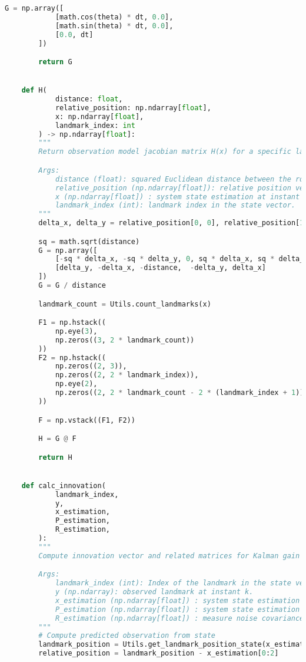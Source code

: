 \documentclass[../CSC_5RO12_TA_TP4.tex]{subfiles}
\begin{document}
\begin{scriptsize}
\begin{lstlisting}[language=Python]
        G = np.array([
            [math.cos(theta) * dt, 0.0],
            [math.sin(theta) * dt, 0.0],
            [0.0, dt]
        ])

        return G


    def H(
            distance: float,
            relative_position: np.ndarray[float],
            x: np.ndarray[float],
            landmark_index: int
        ) -> np.ndarray[float]:
        """
        Return observation model jacobian matrix H(x) for a specific landmark as np.ndarray[float].

        Args:
            distance (float): squared Euclidean distance between the robot and the landmark.
            relative_position (np.ndarray[float]): relative position vector [delta_x, delta_y]^T.
            x (np.ndarray[float]) : system state estimation at instant k.
            landmark_index (int): landmark index in the state vector.
        """
        delta_x, delta_y = relative_position[0, 0], relative_position[1, 0]

        sq = math.sqrt(distance)
        G = np.array([
            [-sq * delta_x, -sq * delta_y, 0, sq * delta_x, sq * delta_y],
            [delta_y, -delta_x, -distance,  -delta_y, delta_x]
        ])
        G = G / distance

        landmark_count = Utils.count_landmarks(x)

        F1 = np.hstack((
            np.eye(3),
            np.zeros((3, 2 * landmark_count))
        ))
        F2 = np.hstack((
            np.zeros((2, 3)),
            np.zeros((2, 2 * landmark_index)),
            np.eye(2),
            np.zeros((2, 2 * landmark_count - 2 * (landmark_index + 1)))
        ))

        F = np.vstack((F1, F2))

        H = G @ F

        return H


    def calc_innovation(
            landmark_index,
            y,
            x_estimation,
            P_estimation,
            R_estimation,
        ):
        """
        Compute innovation vector and related matrices for Kalman gain in EKF-SLAM.

        Args:
            landmark_index (int): Index of the landmark in the state vector.
            y (np.ndarray): observed landmark at instant k.
            x_estimation (np.ndarray[float]) : system state estimation at instant k.
            P_estimation (np.ndarray[float]) : system state estimation covariance at instant k.
            R_estimation (np.ndarray[float]) : measure noise covariance matrix at instant k.
        """
        # Compute predicted observation from state
        landmark_position = Utils.get_landmark_position_state(x_estimation, landmark_index)
        relative_position = landmark_position - x_estimation[0:2]


\end{lstlisting}
\end{scriptsize}
\end{document}
